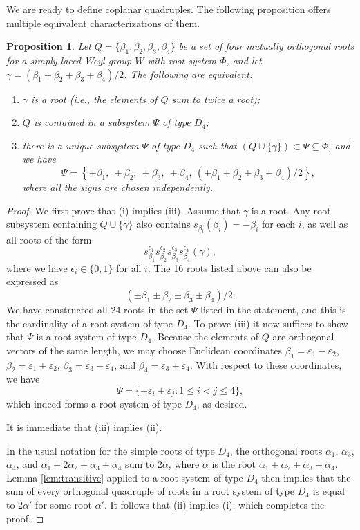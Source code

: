 \documentclass[11pt]{amsart}
\theoremstyle{plain}
\newtheorem{prop}[theorem]{Proposition}
\theoremstyle{definition}
\theoremstyle{remark}
\numberwithin{equation}{subsection}
\newcommand{\al}{\alpha}
\newcommand{\be}{\beta}
\newcommand{\ep}{\varepsilon}
\newcommand{\allroots}{\Phi}
\begin{document}
We are ready to define coplanar quadruples. The following proposition offers
multiple equivalent characterizations of them.

\begin{prop}\label{prop:coll4}
Let $Q = \{\be_1, \be_2, \be_3, \be_4\}$ be a set of four mutually orthogonal
roots for a simply laced Weyl group $W$ with root system $\allroots$, and let
$\gamma = (\be_1 + \be_2 + \be_3 + \be_4)/2$. The following are equivalent:
\begin{enumerate}
    \item[{\rm (i)}]{$\gamma$ is a root (i.e., the elements of $Q$ sum to twice
     a root);}
 \item[{\rm (ii)}]{$Q$ is contained in a subsystem $\Psi$ of type $D_4$;}
 \item[{\rm (iii)}]{there is a unique subsystem $\Psi$ of type $D_4$ such that
     $(Q\cup\{\gamma\}) \subset \Psi \subseteq \allroots$, and we have $$ \Psi =
     \left\{\pm \be_1, \ \pm \be_2, \ \pm \be_3, \ \pm \be_4, \ (\pm \be_1 \pm
     \be_2 \pm \be_3 \pm \be_4)/2\right\} ,$$ where all the signs are chosen
 independently.}
\end{enumerate}
\end{prop}

\begin{proof}
We first prove that (i) implies (iii).  Assume that $\gamma$ is a root. Any root
subsystem containing $Q\cup \{\gamma\}$ also contains $s_{\be_i}(\be_i) =
-\be_i$ for each $i$, as well as all roots of the form $$ s_{\be_1}^{\epsilon_1}
s_{\be_2}^{\epsilon_2} s_{\be_3}^{\epsilon_3} s_{\be_4}^{\epsilon_4}(\gamma) ,$$
where we have $\epsilon_i \in \{0, 1\}$ for all $i$. The 16 roots listed above
can also be expressed as $$ (\pm \be_1 \pm \be_2 \pm \be_3 \pm \be_4)/2 .$$ We
have constructed all 24 roots in the set $\Psi$ listed in the statement, and
this is the cardinality of a root system of type $D_4$. To prove (iii) it now
suffices to show that $\Psi$ is a root system of type $D_4$. Because the
elements of $Q$ are orthogonal vectors of the same length, we may choose
Euclidean coordinates $\be_1 = \ep_1 - \ep_2$, $\be_2 = \ep_1 + \ep_2$, $\be_3 =
\ep_3 - \ep_4$, and $\be_4 = \ep_3 + \ep_4$. With respect to these coordinates,
we have $$ \Psi = \{\pm \ep_i \pm \ep_j : 1 \leq i < j \leq 4\} ,$$ which indeed
forms a root system of type $D_4$, as desired.

It is immediate that (iii) implies (ii).

In the usual notation for the simple roots of type $D_4$, the orthogonal roots
$\al_1$, $\al_3$, $\al_4$, and $\al_1 + 2\al_2 + \al_3 + \al_4$ sum to $2 \al$,
where $\al$ is the root $\al_1 + \al_2 + \al_3 + \al_4$. Lemma
\ref{lem:transitive} applied to a root system of type $D_4$ then implies that
the sum of every orthogonal quadruple of roots in a root system of type $D_4$ is
equal to $2 \al'$ for some root $\al'$. It follows that (ii) implies (i), which
completes the proof.
\end{proof}
\end{document}
